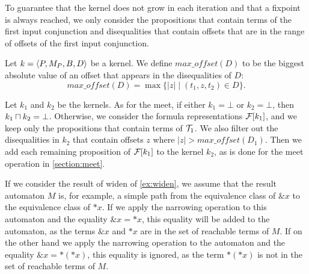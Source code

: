To guarantee that the kernel does not grow in each iteration
and that a fixpoint is always reached, we only consider the propositions that contain terms of the first input conjunction
and disequalities that contain offsets that are in the range of offsets of the first input conjunction.

Let $k = \langle P,M_P,B,D\rangle$ be a kernel. We define $max\_offset(D)$ to be the biggest absolute value of an offset that appears in the disequalities of $D$:
\[
max\_offset(D) = \max\{ \lvert z \rvert \mid (t_1,z,t_2) \in D \}.
\]

Let $k_1$ and $k_2$ be the kernels.
As for the meet, if either $k_1 = \bot$ or $k_2 = \bot$, then $k_1 \sqcap k_2 = \bot$.
Otherwise, we consider the formula representations $\mathcal{F}[k_1]$, and we keep only the propositions that contain terms of $\mathcal{T}_1$.
We also filter out the disequalities in $k_2$ that contain offsets $z$ where $\lvert z \rvert > max\_offset(D_1)$.
Then we add each remaining proposition of $\mathcal{F}[k_1]$ to the kernel $k_2$,
as is done for the meet operation in \cref{section:meet}.

\begin{example}
    If we consider the result of widen of \cref{ex:widen}, we assume that the result automaton $M$
    is, for example, a simple path from the equivalence class of $\&x$ to the equivalence class of $*x$.
    If we apply the narrowing operation to this automaton and the equality $\&x = *x$, this equality will
    be added to the automaton, as the terms $\&x$ and $*x$ are in the set of reachable terms of $M$.
    If on the other hand we apply the narrowing operation to the automaton and the equality $\&x = *(*x)$,
    this equality is ignored, as the term $*(*x)$ is not in the set of reachable terms of $M$.
\end{example}
